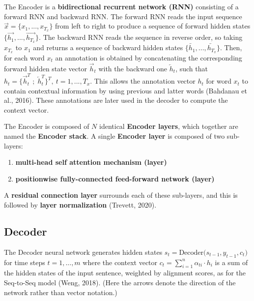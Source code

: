 The Encoder is a \textbf{bidirectional recurrent network (RNN)} consisting of a forward RNN and backward RNN. The forward RNN reads the input sequence $\overrightarrow{x} = \Big\{ x_1,...,x_{T_x} \Big\}$ from left to right to produce a sequence of forward hidden states $\Big\{ \overrightarrow{h_1},..., \overrightarrow{h_{T_x}} \Big\}$. The backward RNN reads the sequence in reverse order, so taking $x_{T_x}$ to $x_1$ and returns a sequence of backward hidden states $\Big\{ \overleftarrow{h_1},..., \overleftarrow{h_{T_x}} \Big\}$. Then, for each word $x_t$ an annotation is obtained by concatenating the corresponding forward hidden state vector $\overrightarrow{h}_t$ with the backward one $\overleftarrow{h}_t$, such that $h_t = \Big \{ \overrightarrow{h}_t^T \; ; \; \overleftarrow{h}_t^T \Big\}^T , \: t=1,...,T_x$. This allows the annotation vector $h_t$ for word $x_t$ to contain contextual information by using previous and latter words (Bahdanau et al., 2016). These annotations are later used in the decoder to compute the context vector. 

The Encoder is composed of $N$ identical \textbf{Encoder layers}, which together are named the \textbf{Encoder stack}. A single \textbf{Encoder layer}  is composed of two sub-layers: 
\begin{enumerate}
    \item \textbf{multi-head self attention mechanism (layer)}
    
    \item \textbf{positionwise fully-connected feed-forward network (layer)}
\end{enumerate}

A \textbf{residual connection layer} surrounds each of these sub-layers, and this is followed by \textbf{layer normalization} (Trevett, 2020).  



\subsection{Decoder}


The Decoder neural network generates hidden states $s_t = \text{Decoder}\Big( s_{t-1}, y_{t-1}, c_t \Big)$ for time steps $t = 1,..., m$ where the context vector $c_t = \sum_{i=1}^n \alpha_{ti} \cdot h_i$ is a sum of the hidden states of the input sentence, weighted by alignment scores, as for the Seq-to-Seq model (Weng, 2018). (Here the arrows denote the direction of the network rather than vector notation.)


